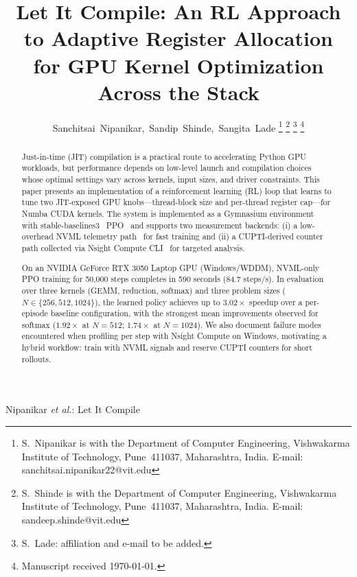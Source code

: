 \documentclass[journal,letterpaper]{IEEEtran}
\begin{document}

\title{Let It Compile: An RL Approach to Adaptive Register Allocation\\for GPU Kernel Optimization Across the Stack}

\author{Sanchitsai~Nipanikar,~Sandip~Shinde,~Sangita~Lade%
\thanks{S.~Nipanikar is with the Department of Computer Engineering,
Vishwakarma Institute of Technology, Pune~411037, Maharashtra, India.
E-mail: sanchitsai.nipanikar22@vit.edu}%
\thanks{S.~Shinde is with the Department of Computer Engineering,
Vishwakarma Institute of Technology, Pune~411037, Maharashtra, India.
E-mail: sandeep.shinde@vit.edu}%
\thanks{S.~Lade: affiliation and e-mail to be added.}%
\thanks{Manuscript received \today.}}

%
{Nipanikar \MakeLowercase{\textit{et al.}}: Let It Compile}

\maketitle

\begin{abstract}
Just-in-time (JIT) compilation is a practical route to accelerating Python GPU workloads, but performance depends on low-level launch and compilation choices whose optimal settings vary across kernels, input sizes, and driver constraints.
This paper presents an implementation of a reinforcement learning (RL) loop that learns to tune two JIT-exposed GPU knobs---thread-block size and per-thread register cap---for Numba CUDA kernels.
The system is implemented as a Gymnasium environment~\cite{gymnasium} with stable-baselines3~\cite{sb3} PPO~\cite{ppo2017} and supports two measurement backends: (i) a low-overhead NVML telemetry path~\cite{nvml} for fast training and (ii) a CUPTI-derived counter path collected via Nsight Compute CLI~\cite{nsightcompute,cupti} for targeted analysis.

On an NVIDIA GeForce RTX 3050 Laptop GPU (Windows/WDDM), NVML-only PPO training for 50{,}000 steps completes in 590 seconds (84.7 steps/s).
In evaluation over three kernels (GEMM, reduction, softmax) and three problem sizes ($N\in\{256,512,1024\}$), the learned policy achieves up to $3.02\times$ speedup over a per-episode baseline configuration, with the strongest mean improvements observed for softmax ($1.92\times$ at $N{=}512$; $1.74\times$ at $N{=}1024$).
We also document failure modes encountered when profiling per step with Nsight Compute on Windows, motivating a hybrid workflow: train with NVML signals and reserve CUPTI counters for short rollouts.
\end{abstract}
\end{document}

